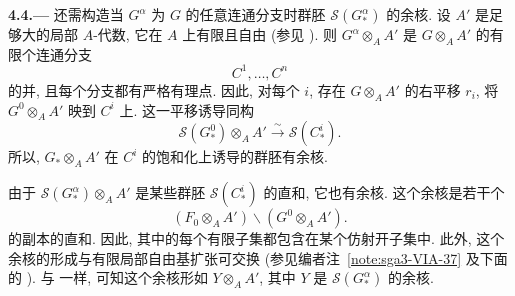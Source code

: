 
\medskip
{}\label{par:sga3-VIA-4.4}%
\noindent\textbf{4.4.---}
还需构造当 \(G^\alpha\) 为 \(G\) 的任意连通分支时群胚
\(\mathscr S(G^\alpha_*)\) 的余核.
设 \(A'\) 是足够大的局部 \(A\)-代数,
它在 \(A\) 上有限且自由 (参见 ).
则 \(G^\alpha\otimes_AA'\) 是 \(G\otimes_AA'\) 的有限个连通分支
\[
  C^1,\ldots,C^n
\]
的并, 且每个分支都有严格有理点.
因此, 对每个 \(i\), 存在 \(G\otimes_AA'\) 的右平移 \(r_i\),
将 \(G^0\otimes_AA'\) 映到 \(C^i\) 上. 这一平移诱导同构
\[
  \mathscr S(G^0_*)\otimes_AA'
    \xrightarrow{\ \sim\ }
  \mathscr S(C^i_*).
\]
所以, \(G_*\otimes_AA'\) 在 \(C^i\) 的饱和化上诱导的群胚有余核.

由于 \(\mathscr S(G^\alpha_*)\otimes_AA'\) 是某些群胚
\(\mathscr S(C^i_*)\) 的直和, 它也有余核.
这个余核是若干个
\[
  (F_0\otimes_AA')\backslash(G^0\otimes_AA').
\]
的副本的直和. 因此, 其中的每个有限子集都包含在某个仿射开子集中.
此外, 这个余核的形成与有限局部自由基扩张可交换
(参见编者注~\ref{note:sga3-VIA-37} 及下面的 ).
与  一样, 可知这个余核形如
\(Y\otimes_AA'\), 其中 \(Y\) 是 \(\mathscr S(G^\alpha_*)\) 的余核.
